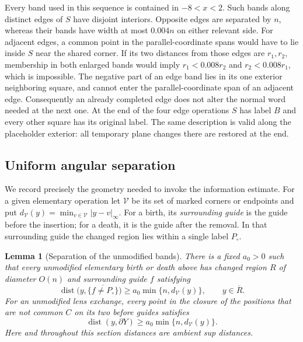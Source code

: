 \documentclass[11pt]{article}
\numberwithin{equation}{section}
\newtheorem{lemma}[theorem]{Lemma}
\theoremstyle{definition}
\theoremstyle{remark}
\begin{document}
Every band used in this sequence is contained in $-8<x<2$.  Such
bands along distinct edges of $S$ have disjoint interiors.  Opposite
edges are separated by $n$, whereas their bands have width at most
$0.004n$ on either relevant side.  For adjacent edges, a common point
in the parallel-coordinate spans would have to lie inside $S$ near
the shared corner.  If its two distances from those edges are $r_1,r_2$,
membership in both enlarged bands would imply
$r_1<0.008r_2$ and $r_2<0.008r_1$, which is impossible.  The negative
part of an edge band lies in its one exterior neighboring square, and
cannot enter the parallel-coordinate span of an adjacent edge.
Consequently an already completed edge does not alter the normal word
needed at the next one.  At the end of the four edge operations $S$
has label $B$ and every other square has its original label.  The same
description is valid along the placeholder exterior: all temporary
plane changes there are restored at the end.

\subsection{Uniform angular separation}

We record precisely the geometry needed to invoke the information
estimate.  For a given elementary operation let $\mathcal V$ be its
set of marked corners or endpoints and put
$d_{\mathcal V}(y)=\min_{v\in\mathcal V}\lvert y-v\rvert_\infty$.
For a birth, its \emph{surrounding guide} is the guide before the
insertion; for a death, it is the guide after the removal.  In that
surrounding guide the changed region lies within a single label
$P_\circ$.

\begin{lemma}[Separation of the unmodified bands]
\label{lem:geometry-angular}
There is a fixed $a_0>0$ such that every unmodified elementary birth or
death above has changed region $R$ of diameter $O(n)$ and surrounding
guide $f$ satisfying
\begin{equation}
 \operatorname{dist}\bigl(y,\overline{\{f\ne P_\circ\}}\bigr)
 \ge a_0\min\{n,d_{\mathcal V}(y)\},
 \qquad y\in\overline R.
 \label{eq:geometry-birth-clearance}
\end{equation}
For an unmodified lens exchange, every point in the closure of the
positions that are not common $C$ on its two before guides satisfies
\begin{equation}
 \operatorname{dist}(y,\partial Y)
 \ge a_0\min\{n,d_{\mathcal V}(y)\}.
 \label{eq:geometry-exchange-clearance}
\end{equation}
Here and throughout this section distances are ambient sup distances.
\end{lemma}
\end{document}
